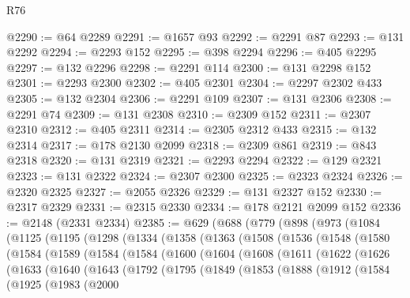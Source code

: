 \begin{lexlean}{R76}
\begin{coremodule}
@2290 := @64 @2289
@2291 := @1657 @93
@2292 := @2291 @87
@2293 := @131 @2292
@2294 := @2293 @152
@2295 := @398 @2294
@2296 := @405 @2295
@2297 := @132 @2296
@2298 := @2291 @114
@2300 := @131 @2298 @152
@2301 := @2293 @2300
@2302 := @405 @2301
@2304 := @2297 @2302 @433
@2305 := @132 @2304
@2306 := @2291 @109
@2307 := @131 @2306
@2308 := @2291 @74
@2309 := @131 @2308
@2310 := @2309 @152
@2311 := @2307 @2310
@2312 := @405 @2311
@2314 := @2305 @2312 @433
@2315 := @132 @2314
@2317 := @178 @2130 @2099
@2318 := @2309 @861
@2319 := @843 @2318
@2320 := @131 @2319
@2321 := @2293 @2294
@2322 := @129 @2321
@2323 := @131 @2322
@2324 := @2307 @2300
@2325 := @2323 @2324
@2326 := @2320 @2325
@2327 := @2055 @2326
@2329 := @131 @2327 @152
@2330 := @2317 @2329
@2331 := @2315 @2330
@2334 := @178 @2121 @2099 @152
@2336 := @2148 (@2331 @2334)
@2385 := @629
    (@688
      (@779
        (@898
          (@973
            (@1084
              (@1125
                (@1195
                  (@1298
                    (@1334
                      (@1358
                        (@1363
                          (@1508
                            (@1536
                              (@1548
                                (@1580
                                  (@1584
                                    (@1589
                                      (@1584
                                        (@1584
                                          (@1600
                                            (@1604
                                              (@1608
                                                (@1611
                                                  (@1622
                                                    (@1626
                                                      (@1633
                                                        (@1640
                                                          (@1643
                                                            (@1792
                                                              (@1795
                                                                (@1849
                                                                  (@1853
                                                                    (@1888
                                                                      (@1912
                                                                        (@1584
                                                                          (@1925
                                                                            (@1983
                                                                              (@2000

\end{coremodule}
\end{lexlean}
